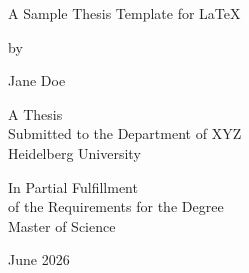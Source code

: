 
\recalctypearea

\begin{titlepage}
	\thispagestyle{empty}
	\makeatletter
	\centering

	\vspace*{2.1cm}
	{\Large\bfseries
		\begin{minipage}{0.88\textwidth}
			\centering
			A Sample Thesis Template for LaTeX
		\end{minipage}\par}

  \vfill

	{\normalsize by\par}
	\vspace{0.15cm}
	{\normalsize Jane Doe \par}

	\vfill

	{\normalsize A Thesis \\ Submitted to the Department of XYZ \\ Heidelberg University \par}

	\vspace{0.5cm}

	{\normalsize In Partial Fulfillment \\ of the Requirements for the Degree \\ Master of Science\par}
  \vspace{0.5cm}
	{\normalsize June 2026\par}

	\makeatother
\end{titlepage}

\recalctypearea

\cleardoublepage